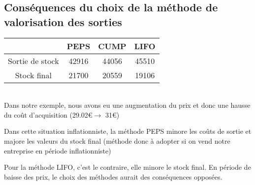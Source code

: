 \documentclass[12pt,a4paper,openany]{report}
\begin{document}
	 \subsection{Conséquences du choix de la méthode de valorisation des sorties}
	 \begin{tabular}{|c|c|c|c|}
		 \hline
		 & \textbf{PEPS} & \textbf{CUMP}& \textbf{LIFO}\\
		 \hline
		 Sortie de stock & 42916 & 44056 & 45510\\
		 \hline
		 Stock final & 21700 & 20559 & 19106\\
		 \hline
	 \end{tabular}
	 \\
	 Dans notre exemple, nous avons eu une augmentation du prix et donc une hausse du coût d'acquisition (29.02\euro $\rightarrow$ 31\euro)

	 Dans cette situation inflationniste, la méthode PEPS minore les coûts de sortie et majore les valeurs du stock final (méthode donc à adopter si on vend notre
	 entreprise en période inflationniste)

	 Pour la méthode LIFO, c'est le contraire, elle minore le stock final. En période de baisse des prix, le choix des méthodes aurait
	 des conséquences opposées.
\end{document}
